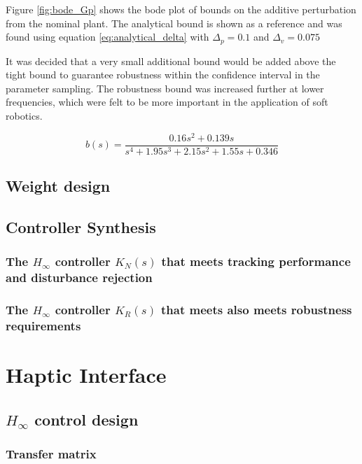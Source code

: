 \documentclass{article}
\begin{document}
Figure \ref{fig:bode_Gp} shows the bode plot of bounds on the additive perturbation from the nominal plant.
The analytical bound is shown as a reference and was found using equation \ref{eq:analytical_delta} with $\Delta_p = 0.1$ and $\Delta_v = 0.075$

It was decided that a very small additional bound would be added above the tight bound to guarantee robustness within the confidence interval in the parameter sampling.
The robustness bound was increased further at lower frequencies, which were felt to be more important in the application of soft robotics.

\begin{equation}
    b(s) = \frac{0.16s^2 + 0.139s}{s^4 + 1.95s^3 + 2.15s^2 + 1.55s + 0.346}
\end{equation}

\subsection{Weight design}

\subsection{Controller Synthesis}

\subsubsection{The $H_\infty$ controller $K_N(s)$ that meets tracking performance and disturbance rejection}

\subsubsection{The $H_\infty$ controller $K_R(s)$ that meets also meets robustness requirements}

\section{Haptic Interface}

\subsection{ $H_\infty$ control design}

\subsubsection{Transfer matrix}
\end{document}

